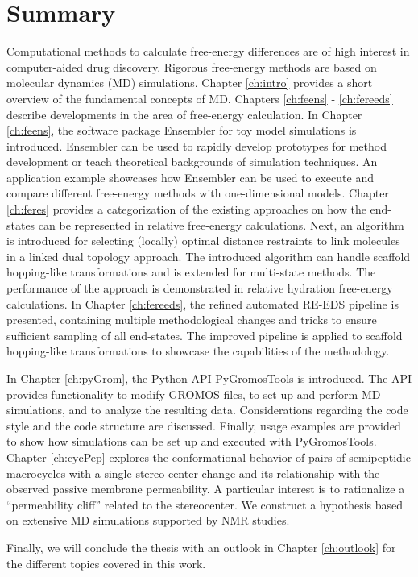 \chapter{Summary}
Computational methods to calculate free-energy differences are of high interest in computer-aided drug discovery. Rigorous free-energy methods are based on molecular dynamics (MD) simulations. Chapter \ref{ch:intro} provides a short overview of the fundamental concepts of MD.   
Chapters \ref{ch:feens} - \ref{ch:fereeds} describe developments in the area of free-energy calculation. 
In Chapter \ref{ch:feens}, the software package Ensembler for toy model simulations is introduced. Ensembler can be used to rapidly develop prototypes for method development or teach theoretical backgrounds of simulation techniques.  An application example showcases how Ensembler can be used to execute and compare different free-energy methods with one-dimensional models. 
Chapter \ref{ch:feres} provides a categorization of the existing approaches on how the end-states can be represented in relative free-energy calculations. Next, an algorithm is introduced for selecting (locally) optimal distance restraints to link molecules in a linked dual topology approach. The introduced algorithm can handle scaffold hopping-like transformations and is extended for multi-state methods. The performance of the approach is demonstrated in relative hydration free-energy calculations. 
In Chapter \ref{ch:fereeds}, the refined automated RE-EDS pipeline is presented, containing multiple methodological changes and tricks to ensure sufficient sampling of all end-states. The improved pipeline is applied to scaffold hopping-like transformations to showcase the capabilities of the methodology.

In Chapter \ref{ch:pyGrom}, the Python API PyGromosTools is introduced. The API provides functionality to modify GROMOS files, to set up and perform MD simulations, and to analyze the resulting data. Considerations regarding the code style and the code structure are discussed. Finally, usage examples are provided to show how simulations can be set up and executed with PyGromosTools. 
Chapter \ref{ch:cycPep} explores the conformational behavior of pairs of semipeptidic macrocycles with a single stereo center change and its relationship with the observed passive membrane permeability. A particular interest is to rationalize a ``permeability cliff'' related to the stereocenter. We construct a hypothesis based on extensive MD simulations supported by NMR studies.

Finally, we will conclude the thesis with an outlook in Chapter \ref{ch:outlook} for the different topics covered in this work.